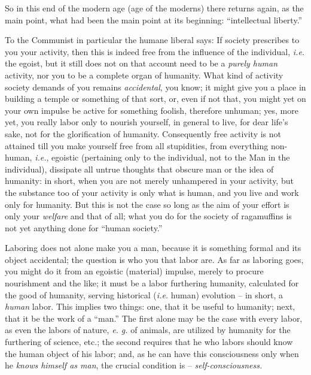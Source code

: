 \documentclass[12pt,a4paper]{book}
\begin{document}
So in this end of the modern age (age of the moderns) there returns again, as 
the main point, what had been the main point at its beginning: ``intellectual 
liberty.''

To the Communist in particular the humane liberal says: If society prescribes 
to you your activity, then this is indeed free from the influence of the 
individual, \textit{i.e.} the egoist, but it still does not on that account 
need to be a \textit{purely human} activity, nor you to be a complete organ of 
humanity. What kind of activity society demands of you remains 
\textit{accidental}, you know; it might give you a place in building a temple 
or something of that sort, or, even if not that, you might yet on your own 
impulse be active for something foolish, therefore unhuman; yes, more yet, you 
really labor only to nourish yourself, in general to live, for dear life's 
sake, not for the glorification of humanity. Consequently free activity is not 
attained till you make yourself free from all stupidities, from everything 
non-human, \textit{i.e.}, egoistic (pertaining only to the individual, not to 
the Man in the individual), dissipate all untrue thoughts that obscure man or 
the idea of humanity: in short, when you are not merely unhampered in your 
activity, but the substance too of your activity is only what is human, and 
you live and work only for humanity. But this is not the case so long as the 
aim of your effort is only your \textit{welfare} and that of all; what you do 
for the society of ragamuffins is not yet anything done for ``human 
society.''

Laboring does not alone make you a man, because it is something formal and its 
object accidental; the question is who you that labor are. As far as laboring 
goes, you might do it from an egoistic (material) impulse, merely to procure 
nourishment and the like; it must be a labor furthering humanity, calculated 
for the good of humanity, serving historical (\textit{i.e.} human) evolution 
-- in short, a \textit{human} labor. This implies two things: one, that it be 
useful to humanity; next, that it be the work of a ``man.'' The first alone 
may be the case with every labor, as even the labors of nature, \textit{e. g.} 
of animals, are utilized by humanity for the furthering of science, etc.; the 
second requires that he who labors should know the human object of his labor; 
and, as he can have this consciousness only when he \textit{knows himself as 
man}, the crucial condition is -- \textit{self-consciousness.}
\end{document}
